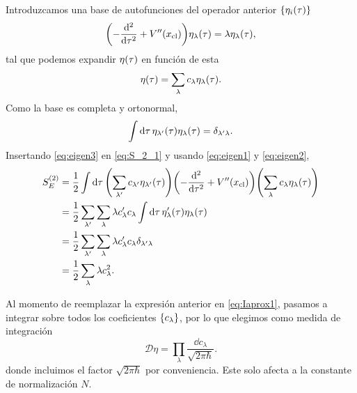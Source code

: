 Introduzcamos una base de autofunciones del operador anterior $\qty{\eta_i \qty(\tau)}$
\begin{equation} \label{eq:eigen1}
\qty( - \dv[2]{\tau} + V''\qty(x_{\text{cl}})) \eta_\lambda\qty(\tau) = \lambda \eta_\lambda\qty(\tau),
\end{equation}
tal que podemos expandir $\eta\qty(\tau)$ en función de esta
 \begin{equation}\label{eq:eigen3}
\eta\qty(\tau) = \sum_\lambda c_\lambda \eta_\lambda \qty(\tau). 
\end{equation}
Como la base es completa y ortonormal, 
\begin{equation} \label{eq:eigen2}
\int \dd{\tau} \eta_{\lambda'}\qty(\tau) \eta_{\lambda}\qty(\tau) = \delta_{\lambda'\lambda}.
\end{equation}
Insertando \eqref{eq:eigen3} en \eqref{eq:S_2_1} y usando \eqref{eq:eigen1} y \eqref{eq:eigen2},
\begin{align}
S_E^{(2)} &= \frac{1}{2} \int \dd{\tau}\qty( \sum_{\lambda'} c_{\lambda'} \eta_{\lambda'} \qty(\tau)) \qty(-\dv[2]{\tau} + V''\qty(x_{\text{cl}})) \qty( \sum_\lambda c_\lambda \eta_\lambda \qty(\tau)) \\
&= \frac{1}{2} \sum_{\lambda'} \sum_\lambda \lambda c_\lambda' c_\lambda \int \dd{\tau} \eta_\lambda' \qty(\tau)  \eta_\lambda \qty(\tau) \\
&= \frac{1}{2} \sum_{\lambda'} \sum_\lambda \lambda c_\lambda' c_\lambda \delta_{\lambda'\lambda} \\
&= \frac{1}{2} \sum_\lambda \lambda c_\lambda^2. \label{eq:S_2_2}
\end{align}

Al momento de reemplazar la expresión anterior en \eqref{eq:Iaprox1}, pasamos a integrar sobre todos los coeficientes $\qty{c_\lambda}$, por lo que elegimos como medida de integración 
\begin{equation}
	\mathcal{D}\eta = \prod_\lambda \frac{\dd{c_\lambda}}{\sqrt{2\pi \hbar}}.
\end{equation}
donde incluimos el factor $\sqrt{2\pi \hbar}$ por conveniencia. Este solo afecta a la constante de normalización $N$. 

